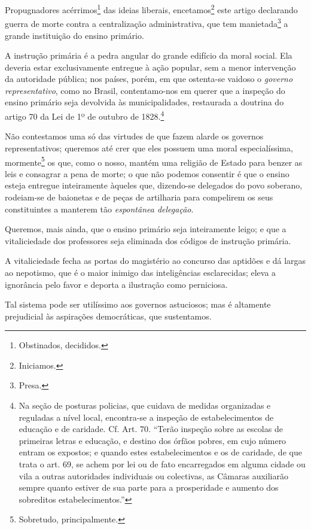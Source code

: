 Propugnadores acérrimos\footnote{Obstinados, decididos.} das ideias
liberais, encetamos\footnote{Iniciamos.} este artigo declarando guerra
de morte contra a centralização administrativa, que tem
manietada\footnote{Presa.} a grande instituição do ensino primário.

A instrução primária é a pedra angular do grande edifício da moral
social. Ela deveria estar exclusivamente entregue à ação popular, sem a
menor intervenção da autoridade pública; nos países, porém, em que
ostenta-se vaidoso o \emph{governo representativo}, como no Brasil,
contentamo-nos em querer que a inspeção do ensino primário seja
devolvida às municipalidades, restaurada a doutrina do artigo 70 da Lei
de 1º de outubro de 1828.\footnote{Na seção de posturas policias, que
  cuidava de medidas organizadas e reguladas a nível local, encontra-se
  a inspeção de estabelecimentos de educação e de caridade. Cf. Art. 70.
  ``Terão inspeção sobre as escolas de primeiras letras e educação, e
  destino dos órfãos pobres, em cujo número entram os expostos; e quando
  estes estabelecimentos e os de caridade, de que trata o art. 69, se
  achem por lei ou de fato encarregados em alguma cidade ou vila a
  outras autoridades individuais ou colectivas, as Câmaras auxiliarão
  sempre quanto estiver de sua parte para a prosperidade e aumento dos
  sobreditos estabelecimentos.''}

Não contestamos uma só das virtudes de que fazem alarde os governos
representativos; queremos até crer que eles possuem uma moral
especialíssima, mormente\footnote{Sobretudo, principalmente.} os que,
como o nosso, mantém uma religião de Estado para benzer as leis e
consagrar a pena de morte; o que não podemos consentir é que o ensino
esteja entregue inteiramente àqueles que, dizendo-se delegados do povo
soberano, rodeiam-se de baionetas e de peças de artilharia para
compelirem os seus constituintes a manterem tão \emph{espontânea
delegação}.

Queremos, mais ainda, que o ensino primário seja inteiramente leigo; e
que a vitaliciedade dos professores seja eliminada dos códigos de
instrução primária.

A vitaliciedade fecha as portas do magistério ao concurso das aptidões e
dá largas ao nepotismo, que é o maior inimigo das inteligências
esclarecidas; eleva a ignorância pelo favor e deporta a ilustração como
perniciosa.

Tal sistema pode ser utilíssimo aos governos astuciosos; mas é altamente
prejudicial às aspirações democráticas, que sustentamos.


